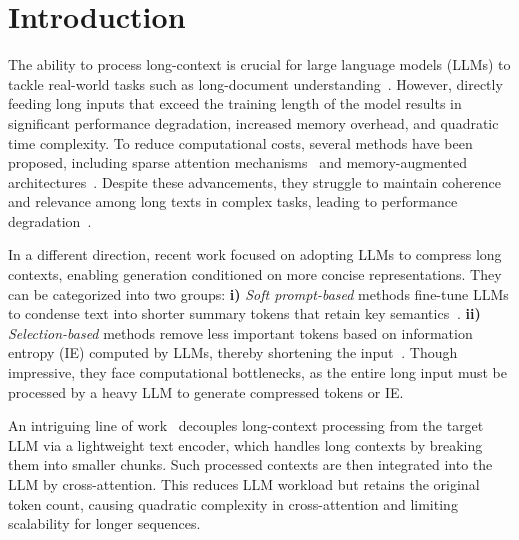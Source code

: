 \section{Introduction}
\label{sec:intro}
The ability to process long-context is crucial for large language models (LLMs) to tackle real-world tasks such as long-document understanding~\cite{brown2020language,qwen}.
However, directly feeding long inputs that exceed the training length of the model results in significant performance degradation, increased memory overhead, and quadratic time complexity.
To reduce computational costs, several methods have been proposed, including sparse attention mechanisms~\cite{dao2022flashattention,liuringattention} and memory-augmented architectures~\cite{mohtashami2023random, tworkowski2024focused}. 
Despite these advancements, they struggle to maintain coherence and relevance among long texts in complex tasks, leading to performance degradation~\cite{gecontext}.


In a different direction, recent work focused on adopting LLMs to compress long contexts, enabling generation conditioned on more concise representations. 
They can be categorized into two groups: 
\textbf{i)} \textit{Soft prompt-based} methods fine-tune LLMs to condense text into shorter summary tokens that retain key semantics~$_{\!}$\cite{chevalier2023adapting,gecontext}. 
\textbf{ii)} \textit{Selection-based} methods remove less important tokens based on information entropy (IE) computed by LLMs, thereby shortening the input~$_{\!}$\cite{li2023compressing, jiang2023llmlingua}. 
Though impressive, they face computational bottlenecks, as the entire long input must be processed by a heavy LLM to generate compressed tokens or IE.


An intriguing line of work~\cite{yen2024long} decouples long-context processing from the target LLM via a lightweight text encoder, which handles long contexts by breaking them into smaller chunks. Such processed contexts are then  integrated into the LLM by cross-attention.
This reduces LLM workload but retains the original token count, causing quadratic complexity in cross-attention and limiting scalability for longer sequences.



